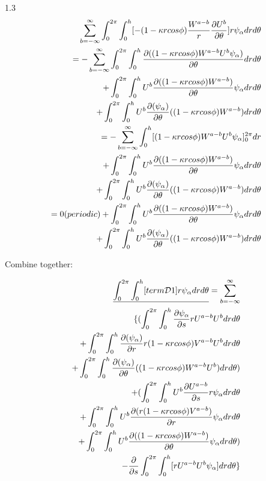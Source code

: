 \documentclass{Note}
\begin{document}
1.3
\begin{equation}
\begin{aligned}
\sum_{b=-\infty}^{\infty}\int_0^{2\pi} \int_0^h  [-(1-\kappa rcos\phi){W^{a-b}\over r}{{\partial U^b}\over {\partial \theta}}]  r \psi_\alpha dr d\theta\\
=-\sum_{b=-\infty}^{\infty} \int_0^{2\pi} \int_0^h {\partial ((1-\kappa rcos\phi)W^{a-b}U^b \psi_\alpha )\over\partial \theta}dr d\theta \\
+\int_0^{2\pi} \int_0^h U^b{ \partial ((1-\kappa rcos\phi)W^{a-b})\over\partial \theta}\psi_\alpha dr d\theta \\
+\int_0^{2\pi} \int_0^h U^b{ \partial (\psi_\alpha) \over\partial \theta} ((1-\kappa rcos\phi)W^{a-b})dr d\theta \\
=-\sum_{b=-\infty}^{\infty} \int_0^{h} [ (1-\kappa rcos\phi)W^{a-b}U^b\psi_\alpha ]_0^{2\pi}  dr \\
+\int_0^{2\pi} \int_0^h U^b{ \partial ((1-\kappa rcos\phi)W^{a-b})\over\partial \theta}\psi_\alpha dr d\theta \\
+\int_0^{2\pi} \int_0^h U^b{ \partial (\psi_\alpha) \over\partial \theta} ((1-\kappa rcos\phi)W^{a-b})dr d\theta \\
=0(periodic)+\int_0^{2\pi} \int_0^h U^b{ \partial ((1-\kappa rcos\phi)W^{a-b})\over\partial \theta}\psi_\alpha dr d\theta\\
+\int_0^{2\pi} \int_0^h U^b{ \partial (\psi_\alpha) \over\partial \theta} ((1-\kappa rcos\phi)W^{a-b})dr d\theta \\
\end{aligned}
\end{equation}

Combine together:

\begin{equation}
\begin{aligned}
\underline{\int_0^{2\pi} \int_0^h  [term\mathcal{D}1]  r \psi_\alpha dr d\theta}=\sum_{b=-\infty}^{\infty}\\
\{ (\int_0^{2\pi}\int_0^h   {{\partial \psi_\alpha}\over {\partial s}}{r U^{a-b}U^b} dr d\theta \\
+\int_0^{2\pi} \int_0^h { \partial (\psi_\alpha)\over\partial r} r(1-\kappa rcos\phi)V^{a-b}U^b dr d\theta \\
+\int_0^{2\pi} \int_0^h { \partial (\psi_\alpha) \over\partial \theta} ((1-\kappa rcos\phi)W^{a-b}U^b)dr d\theta )\\
+(\int_0^{2\pi}\int_0^h  U^b {{\partial U^{a-b}}\over {\partial s}} r\psi_\alpha dr d\theta \\
+\int_0^{2\pi} \int_0^h U^b{ \partial (r(1-\kappa rcos\phi)V^{a-b})\over\partial r}\psi_\alpha dr d\theta \\
+\int_0^{2\pi} \int_0^h U^b{ \partial ((1-\kappa rcos\phi)W^{a-b})\over\partial \theta}\psi_\alpha dr d\theta)\\
-{{\partial }\over {\partial s}}\int_0^{2\pi}\int_0^h   [ {r U^{a-b}} U^b\psi_\alpha] dr d\theta \}
\end{aligned}
\end{equation}
\end{document}

